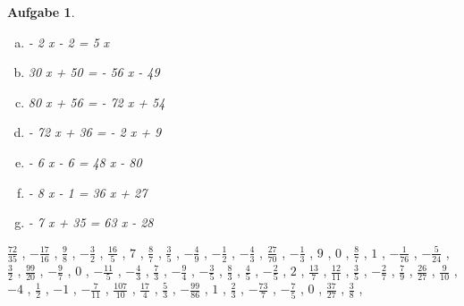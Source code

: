 \documentclass[12pt,fleqn]{article}
\theoremstyle{aufg}
\newtheorem{aufgabe}{Aufgabe}
\theoremstyle{bsp}
\begin{document}
\begin{flushleft}
\begin{aufgabe}
\begin{multicols}{2}
\begin{enumerate}[a)]
\item 
- 2 x - 2 = 5 x
\item 
30 x + 50 = - 56 x - 49
\item 
80 x + 56 = - 72 x + 54
\item 
- 72 x + 36 = - 2 x + 9
\item 
- 6 x - 6 = 48 x - 80
\item 
- 8 x - 1 = 36 x + 27
\item 
- 7 x + 35 = 63 x - 28
\end{enumerate} 
\end{multicols} 
\end{aufgabe} 
$ \scriptstyle\frac{72}{35}$ , $ \scriptstyle- \frac{17}{16}$ , $ \scriptstyle\frac{9}{8}$ , $ \scriptstyle- \frac{3}{2}$ , $ \scriptstyle\frac{16}{5}$ , $ \scriptstyle7$ , $ \scriptstyle\frac{8}{7}$ , $ \scriptstyle\frac{3}{5}$ , $ \scriptstyle- \frac{4}{9}$ , $ \scriptstyle- \frac{1}{2}$ , $ \scriptstyle- \frac{4}{3}$ , $ \scriptstyle\frac{27}{70}$ , $ \scriptstyle- \frac{1}{3}$ , $ \scriptstyle9$ , $ \scriptstyle0$ , $ \scriptstyle\frac{8}{7}$ , $ \scriptstyle1$ , $ \scriptstyle- \frac{1}{76}$ , $ \scriptstyle- \frac{5}{24}$ , $ \scriptstyle\frac{3}{2}$ , $ \scriptstyle\frac{99}{20}$ , $ \scriptstyle- \frac{9}{7}$ , $ \scriptstyle0$ , $ \scriptstyle- \frac{11}{5}$ , $ \scriptstyle- \frac{4}{3}$ , $ \scriptstyle\frac{7}{3}$ , $ \scriptstyle- \frac{9}{4}$ , $ \scriptstyle- \frac{3}{5}$ , $ \scriptstyle\frac{8}{3}$ , $ \scriptstyle\frac{4}{5}$ , $ \scriptstyle- \frac{2}{5}$ , $ \scriptstyle2$ , $ \scriptstyle\frac{13}{7}$ , $ \scriptstyle\frac{12}{11}$ , $ \scriptstyle\frac{3}{5}$ , $ \scriptstyle- \frac{2}{7}$ , $ \scriptstyle\frac{7}{9}$ , $ \scriptstyle\frac{26}{27}$ , $ \scriptstyle\frac{9}{10}$ , $ \scriptstyle-4$ , $ \scriptstyle\frac{1}{2}$ , $ \scriptstyle-1$ , $ \scriptstyle- \frac{7}{11}$ , $ \scriptstyle\frac{107}{10}$ , $ \scriptstyle\frac{17}{4}$ , $ \scriptstyle\frac{5}{3}$ , $ \scriptstyle- \frac{99}{86}$ , $ \scriptstyle1$ , $ \scriptstyle\frac{2}{3}$ , $ \scriptstyle- \frac{73}{7}$ , $ \scriptstyle- \frac{7}{5}$ , $ \scriptstyle0$ , $ \scriptstyle\frac{37}{27}$ , $ \scriptstyle\frac{3}{8}$ , \\[0.2em] 

\end{flushleft}
\end{document}
